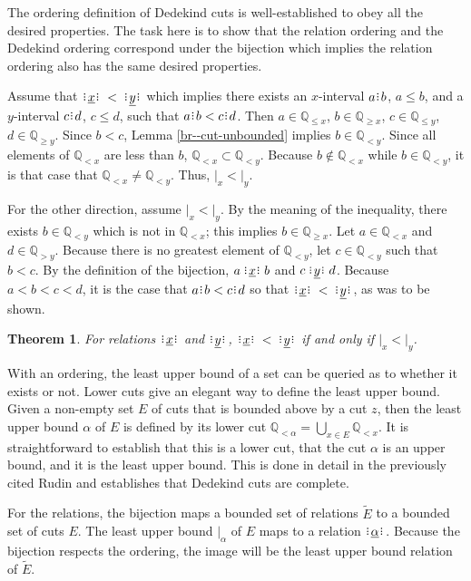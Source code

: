 \documentclass[12pt]{article}
\newtheorem{theorem}{Theorem}
\newcommand{\qcut}[2][x]{\ensuremath{\mathbb{Q}_{#2 #1}}}
\newcommand{\qlt}[1][x]{\qcut[#1]{<}}
\newcommand{\qgt}[1][x]{\qcut[#1]{>}}
\newcommand{\qgeq}[1][x]{\qcut[#1]{\geq}}
\newcommand{\qleq}[1][x]{\qcut[#1]{\leq}}
\newcommand{\cut}[1][x]{{\vert}_{#1} }
\newcommand{\yrel}{\xrel[y]}
\begin{document}
The ordering definition of Dedekind cuts is well-established to obey all the desired properties. The task here is to show that the relation ordering and the Dedekind ordering correspond under the bijection which implies the relation ordering also has the same desired properties. 

Assume that $\xrel  \:<\: \yrel$ which implies there exists an $x$-interval $a \rint b$, $a \leq b$,  and a $y$-interval $c\rint d$, $c \leq d$, such that $a \rint b < c\rint d$. Then $a \in \qleq$, $b \in \qgeq$, $c \in \qleq[y]$, $d \in \qgeq[y]$. Since $ b< c$, Lemma \ref{br--cut-unbounded} implies $b \in \qlt[y]$. Since all elements of $\qlt$ are less than $b$, $\qlt \subset \qlt[y]$. Because $b\notin \qlt$ while $b \in \qlt[y]$, it is that case that $\qlt \neq \qlt[y]$. Thus,  $\cut < \cut[y]$. 

For the other direction, assume $\cut < \cut[y]$. By the meaning of the inequality, there exists $b \in \qlt[y]$ which is not in $\qlt$; this implies $b \in \qgeq$. Let $a \in \qlt$ and $d \in \qgt[y]$.  Because there is no greatest element of $\qlt[y]$, let $c\in \qlt[y]$ such that $b < c$. By the definition of the bijection,  $a \xrel b$ and $c \yrel d$. Because $a < b < c < d$, it is the case that $a \rint b < c\rint d$ so that $\xrel  \:<\: \yrel$, as was to be shown. 

\begin{theorem}
For relations $\xrel$ and $\yrel$, $\xrel  \:<\: \yrel$ if and only if $\cut < \cut[y]$.
\end{theorem}


With an ordering, the least upper bound of a set can be queried as to whether it exists or not. Lower cuts give an elegant way to define the least upper bound. Given a non-empty set $E$ of cuts that is bounded above by a cut $z$, then the least upper bound $\alpha$ of $E$ is defined by its lower cut $\qlt[\alpha] = \bigcup_{x \in E} \qlt$. It is straightforward to establish that this is a lower cut, that the cut $\alpha$ is an upper bound, and it is the least upper bound. This is done in detail in the previously cited Rudin \cite{rudin} and establishes that Dedekind cuts are complete. 

 For the relations, the bijection maps a bounded set of relations $\tilde{E}$ to a bounded set of cuts $E$. The least upper bound $\cut[\alpha]$ of $E$ maps to a relation $\xrel[\alpha]$. Because the bijection respects the ordering, the image will be the least upper bound relation of $\tilde{E}$. 
\end{document}
